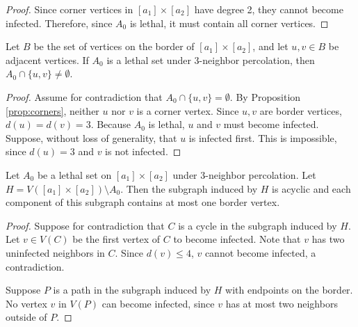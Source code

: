\begin{proof}
Since corner vertices in $[a_1] \times [a_2]$ have degree 2, they cannot become infected. Therefore, since $A_0$ is lethal, it must contain all corner vertices.
\end{proof}

\begin{prop}
\label{prop:border}
Let $B$ be the set of vertices on the border of $[a_1] \times [a_2]$, and let $u,v \in B$ be adjacent vertices. If $A_0$ is a lethal set under 3-neighbor percolation, then $A_0 \cap \{u,v\} \neq \emptyset$.
\end{prop}

\begin{proof}
Assume for contradiction that $A_0 \cap \{u,v\} = \emptyset$. By Proposition \ref{prop:corners}, neither $u$ nor $v$ is a corner vertex. Since $u,v$ are border vertices, $d(u) = d(v) = 3$. Because $A_0$ is lethal, $u$ and $v$ must become infected. Suppose, without loss of generality, that $u$ is infected first. This is impossible, since $d(u) = 3$ and $v$ is not infected.
\end{proof}

\begin{prop}
\label{prop:immune_regions}
Let $A_0$ be a lethal set on $[a_1] \times [a_2]$ under 3-neighbor percolation. Let $H = V([a_1] \times [a_2]) \setminus A_0$. Then the subgraph induced by $H$ is acyclic and each component of this subgraph contains at most one border vertex.
\end{prop}

\begin{proof}
Suppose for contradiction that $C$ is a cycle in the subgraph induced by $H$. Let $v \in V(C)$ be the first vertex of $C$ to become infected. Note that $v$ has two uninfected neighbors in $C$. Since $d(v) \leq 4$, $v$ cannot become infected, a contradiction.

Suppose $P$ is a path in the subgraph induced by $H$ with endpoints on the border. No vertex $v$ in $V(P)$ can become infected, since $v$ has at most two neighbors outside of $P$.
\end{proof}

